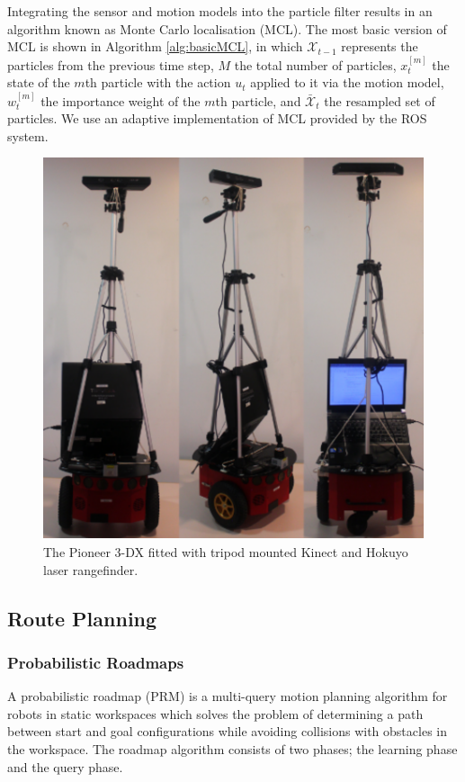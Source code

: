 \documentclass[conference]{IEEEtran}
\begin{document}
Integrating the sensor and motion models into the particle filter results in an algorithm known as Monte Carlo localisation (MCL). The most basic version of MCL is shown in Algorithm \ref{alg:basicMCL}, in which $\mathcal{X}_{t-1}$ represents the particles from the previous time step, $M$ the total number of particles, $x_t^{[m]}$ the state of the $m$th particle with the action $u_t$ applied to it via the motion model, $w_t^{[m]}$ the importance weight of the $m$th particle, and $\bar{\mathcal{X}}_t$ the resampled set of particles. We use an adaptive implementation of MCL provided by the ROS system.
\begin{figure}
  \centering
  \includegraphics[width=\columnwidth]{robotmulti}
  \caption{The Pioneer 3-DX fitted with tripod mounted Kinect and Hokuyo laser rangefinder.}
  \label{fig:robotpic}
\end{figure}
\subsection{Route Planning}
\subsubsection{Probabilistic Roadmaps}
A probabilistic roadmap (PRM) is a  multi-query motion planning algorithm for robots in static workspaces \cite{prm} which solves the problem of determining a path between start and goal configurations while avoiding collisions with obstacles in the workspace. The roadmap algorithm consists of two phases; the learning phase and the query phase.
\end{document}
